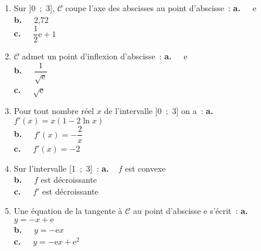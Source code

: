 \begin{enumerate}
     \item Sur ]0~;~3], $\mathscr{C}$ coupe l'axe des abscisses au point d'abscisse~:
    \smallbreak
           \textbf{a.~~} e \\ \textbf{b.~~} 2,72 \\ \textbf{c.~~} $\dfrac{1}{2}\text{e} + 1$
     \medbreak
     \item  $\mathscr{C}$ admet un point d'inflexion d'abscisse~:
    \smallbreak
          \textbf{a.~~} e \\ \textbf{b.~~} $\dfrac{1}{\sqrt{\text{e}}}$\\ \textbf{c.~~} $\sqrt{\text{e}}$
    
     \medbreak
     \item  Pour tout nombre réel $x$ de l'intervalle ]0~;~3] on a~:
    \smallbreak
            \textbf{a.~~} $f'(x) = x(1 - 2\ln x)$\\ \textbf{b.~~} $f'(x)= - \dfrac{2}{x}$
          \\ \textbf{c.~~} $f'(x) = - 2$
    
     \medbreak
     \item  Sur l'intervalle [1~;~3]~:
    \smallbreak
          \textbf{a.~~}$f$ est convexe \\ \textbf{b.~~} $f$ est décroissante \\ \textbf{c.~~} $f'$ est décroissante
    
     \medbreak
     \item  Une équation de la tangente à $\mathscr{C}$  au point d'abscisse e s'écrit~:
    \smallbreak
           \textbf{a.~~} $y= -x+ \text{e}$\\ \textbf{b.~~} $y= - \text{e}x$ \\ \textbf{c.~~} $y = - \text{e}x + \text{e}^2$
    
     \medbreak
\end{enumerate}

